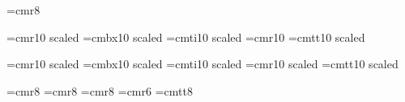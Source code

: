 \font\tensm=cmr8

\font\elevenrm=cmr10 scaled \magstephalf
\font\elevenbf=cmbx10 scaled \magstephalf
\font\elevenit=cmti10 scaled \magstephalf
\font\elevensm=cmr10
\font\eleventt=cmtt10 scaled \magstephalf

\font\twelverm=cmr10 scaled 
\font\twelvebf=cmbx10 scaled 
\font\twelveit=cmti10 scaled 
\font\twelvesm=cmr10 scaled \magstephalf
\font\twelvett=cmtt10 scaled 

\font\eightrm=cmr8
\font\eightit=cmr8
\font\eightbf=cmr8
\font\eightsm=cmr6
\font\eighttt=cmtt8

\def\tenpoint{%
  \let\rm=\tenrm \let\it=\tenit \let\bf=\tenbf \let\sm=\tensm
  \tenrm}
\def\elevenpoint{%
  \let\rm=\elevenrm \let\it=\elevenit \let\bf=\elevenbf \let\sm=\elevensm
  \elevenrm}
\def\twelvepoint{%
  \let\rm=\twelverm \let\it=\twelveit \let\bf=\twelvebf \let\sm=\twelvesm
  \twelverm}
\def\eightpoint{%
  \let\rm=\eightrm \let\it=\eightit \let\bf=\eightbf \let\sm=\eightsm
  \eightrm}

\tenpoint
